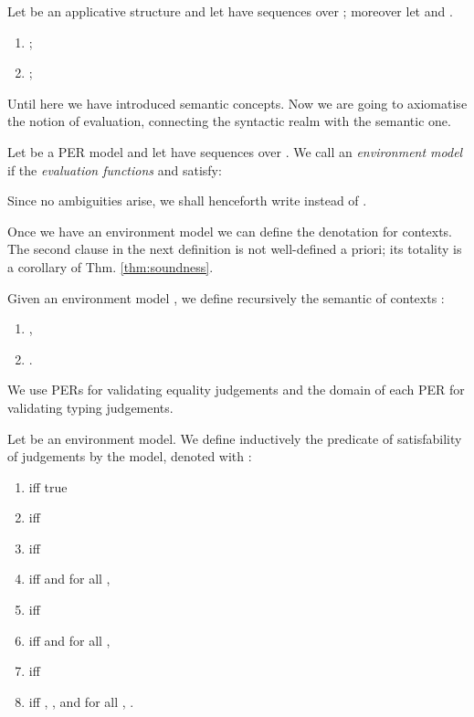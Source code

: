 \documentclass{LMCS}
\begin{document}
{\begin{defi} Let  be an applicative structure and let 
  have sequences over ; moreover let  and .
  \begin{enumerate}[(1)]
   \item ;
   \item ;
  \end{enumerate}
\end{defi}

Until here we have introduced semantic concepts. Now we are going to
axiomatise the notion of evaluation, connecting the syntactic realm
with the semantic one.

\begin{defi}\label{def:syn-app-str}
  Let  be a PER model and let  have
  sequences over .  We call  an {\em environment model} if
  the {\em evaluation functions}  and  satisfy:
  \newlength{\originalArrayColSep} \setlength{\originalArrayColSep}{\arraycolsep} 
  \setlength\arraycolsep{0.3em}
  
  \setlength\arraycolsep{\originalArrayColSep}
Since no ambiguities arise, we shall henceforth
write  instead of .
\end{defi}

Once we have an environment model  we can define the denotation
for contexts. The second clause in the next definition is not
well-defined a priori; its totality is a corollary of
Thm. \ref{thm:soundness}.

\begin{defi}Given an environment model , we define recursively
  the semantic of contexts :
  \begin{enumerate}[(1)]
  \item ,
  \item .
  \end{enumerate}  
\end{defi}\medskip

\noindent We use PERs for validating equality judgements and the domain of each
PER for validating typing judgements.

\begin{defi}[Validity] Let  be an environment model. We
  define inductively the predicate of satisfability of judgements by
  the model, denoted with :
  \begin{enumerate}[(1)]
  \item  iff true
  \item  iff 
  \item  iff 
  \item  iff  and for all , 
  \item  iff 
  \item  iff  and for all , 
  \item  iff 
  \item  iff ,
    , and for all ,
    .
  \end{enumerate}
\end{defi}


}
\end{document}
